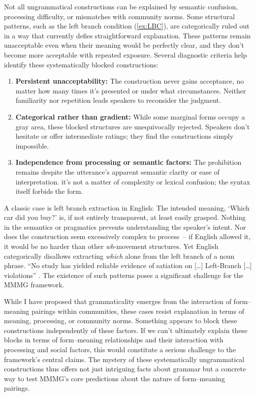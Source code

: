 \documentclass[12pt,letterpaper]{article}
\begin{document}
Not all ungrammatical constructions can be explained by semantic confusion, processing difficulty, or mismatches with community norms. Some structural patterns, such as the left branch condition (\ref{ex:LBC}), are categorically ruled out in a way that currently defies straightforward explanation. These patterns remain unacceptable even when their meaning would be perfectly clear, and they don't become more acceptable with repeated exposure.
Several diagnostic criteria help identify these systematically blocked constructions:
\begin{enumerate}
\item \textbf{Persistent unacceptability:} The construction never gains acceptance, no matter how many times it's presented or under what circumstances. Neither familiarity nor repetition leads speakers to reconsider the judgment.
\item \textbf{Categorical rather than gradient:} While some marginal forms occupy a gray area, these blocked structures are unequivocally rejected. Speakers don't hesitate or offer intermediate ratings; they find the constructions simply impossible.
\item \textbf{Independence from processing or semantic factors:} The prohibition remains despite the utterance's apparent semantic clarity or ease of interpretation. it's not a matter of complexity or lexical confusion; the syntax itself forbids the form.
\end{enumerate}
A classic case is left branch extraction in English:
\label{ex:LBC}
\z
The intended meaning, `Which car did you buy?' is, if not entirely transparent, at least easily grasped. Nothing in the semantics or pragmatics prevents understanding the speaker's intent. Nor does the construction seem excessively complex to process~-- if English allowed it, it would be no harder than other \textit{wh}-movement structures. Yet English categorically disallows extracting \textit{which} alone from the left branch of a noun phrase. ``No study has yielded reliable evidence of satiation on [\dots] Left-Branch [\dots] violations'' \autocite[22]{Snyder2022}.
The existence of such patterns poses a significant challenge for the MMMG framework.

While I have proposed that grammaticality emerges from the interaction of form--meaning pairings within communities, these cases resist explanation in terms of meaning, processing, or community norms. Something appears to block these constructions independently of these factors. If we can't ultimately explain these blocks in terms of form--meaning relationships and their interaction with processing and social factors, this would constitute a serious challenge to the framework's central claims. The mystery of these systematically ungrammatical constructions thus offers not just intriguing facts about grammar but a concrete way to test MMMG's core predictions about the nature of form--meaning pairings.
\end{document}
